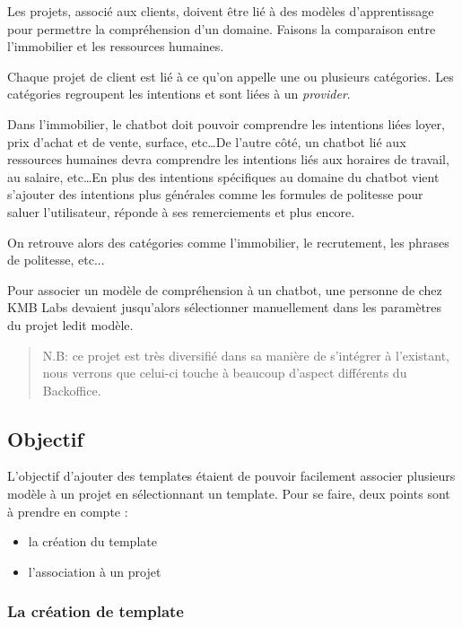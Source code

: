 \documentclass[12pt,a4paper,oneside]{scrreprt}
\begin{document}
Les projets, associé aux clients, doivent être lié à des modèles d'apprentissage pour permettre la compréhension d'un domaine. Faisons la comparaison entre l'immobilier et les ressources humaines.

Chaque projet de client est lié à ce qu'on appelle une ou plusieurs catégories. Les catégories regroupent les intentions et sont liées à un \textit{provider}.

Dans l'immobilier, le chatbot doit pouvoir comprendre les intentions liées loyer, prix d'achat et de vente, surface, etc\dots De l'autre côté, un chatbot lié aux ressources humaines devra comprendre les intentions liés aux horaires de travail, au salaire, etc\dots En plus des intentions spécifiques au domaine du chatbot vient s'ajouter des intentions plus générales comme les formules de politesse pour saluer l'utilisateur, réponde à ses remerciements et plus encore.

On retrouve alors des catégories comme l'immobilier, le recrutement, les phrases de politesse, etc...

\begin{problem}
Pour associer un modèle de compréhension à un chatbot, une personne de chez KMB Labs devaient jusqu'alors sélectionner manuellement dans les paramètres du projet ledit modèle.
\end{problem}

\begin{quote}
N.B: ce projet est très diversifié dans sa manière de s'intégrer à l'existant, nous verrons que celui-ci touche à beaucoup d'aspect différents du Backoffice.
\end{quote}

\newpage
\subsection{Objectif}

L'objectif d'ajouter des templates étaient de pouvoir facilement associer plusieurs modèle à un projet en sélectionnant un template. Pour se faire, deux points sont à prendre en compte :
\begin{itemize}
	\item la création du template
	\item l'association à un projet
\end{itemize}

\subsubsection{La création de template}
\end{document}
